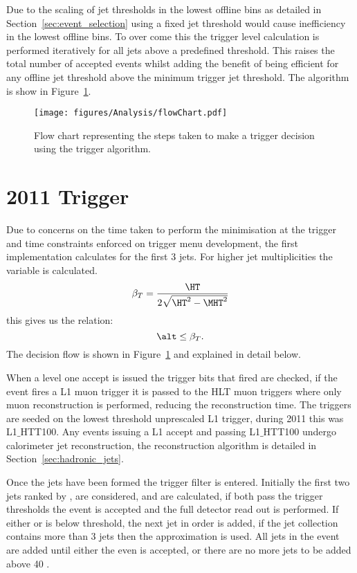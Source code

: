 Due to the scaling of jet thresholds in the lowest offline \HT bins as detailed 
in Section~\ref{sec:event_selection} using a fixed jet threshold would cause inefficiency in the lowest offline \HT bins. To over come this the trigger level \alt calculation is performed iteratively for all jets above a predefined threshold. This raises the total number of accepted events whilst adding the benefit of being efficient for any offline jet threshold above the minimum trigger jet threshold. The algorithm is show in Figure~\ref{fig:figures_Analysis_flowChart}.


\begin{figure}[ht!]
  \centering
    \texttt{[image: figures/Analysis/flowChart.pdf]}
  \caption{Flow chart representing the steps taken to make a trigger decision 
  using the \alt trigger algorithm.}
  \label{fig:figures_Analysis_flowChart}
\end{figure}


\section{2011 Trigger} %
\label{sec:2011_trigger}
Due to concerns on the time taken to perform the \dHT minimisation at the trigger and time constraints enforced on trigger menu development, the first implementation calculates \alt for the first 3 jets. For higher jet multiplicities the variable \bt is calculated.
\begin{equation}
  \beta_{T} = \frac{\HT}{2\sqrt{\HT^{2} - \MHT^{2}}}
  \label{eqn:betaT}
\end{equation}
this gives us the relation:
\begin{equation}
  \alt \leq \beta_{T}.
\end{equation}
The decision flow is shown in Figure~\ref{fig:figures_Analysis_flowChart} and explained in detail below.

When a level one accept is issued the trigger bits that fired are checked, if the event fires a L1 muon trigger it is passed to the HLT muon triggers where only muon reconstruction is performed, reducing the reconstruction time. The \alt triggers are seeded on the lowest threshold unprescaled L1 \HT trigger, during 2011 this was L1$\_$HTT100. Any events issuing a L1 accept and passing L1$\_$HTT100 undergo calorimeter jet reconstruction, the reconstruction algorithm is detailed in Section~\ref{sec:hadronic_jets}.

Once the jets have been formed the trigger filter is entered. Initially the first two jets ranked by \ET, are considered, \HT and \alt are calculated, if both pass the trigger thresholds the event is accepted and the full detector read out is performed. If either \HT or \alt is below threshold, the next jet in \ET order is added, if the jet collection contains more than 3 jets then the \bt approximation is used. All jets in the event are added until either the even is accepted, or there are no more jets to be added above 40 \GeV.

